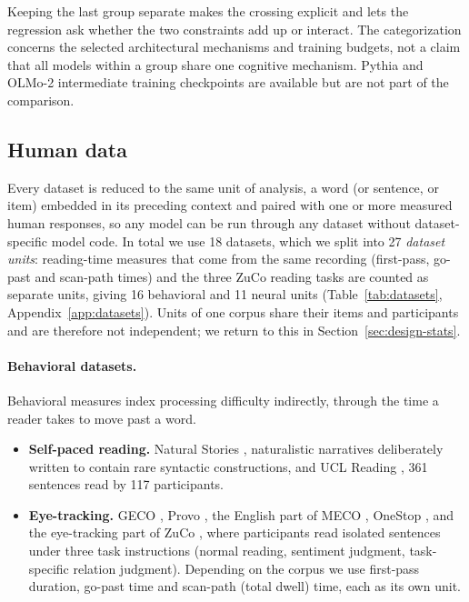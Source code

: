 Keeping the last group separate makes the crossing explicit and lets the regression ask whether the two constraints add up or interact. The categorization concerns the selected architectural mechanisms and training budgets, not a claim that all models within a group share one cognitive mechanism. Pythia and OLMo-2 intermediate training checkpoints are available but are not part of the comparison.

\subsection{Human data}
\label{sec:design-data}

Every dataset is reduced to the same unit of analysis, a word (or sentence, or item) embedded in its preceding context and paired with one or more measured human responses, so any model can be run through any dataset without dataset-specific model code. In total we use 18 datasets, which we split into 27 \emph{dataset units}: reading-time measures that come from the same recording (first-pass, go-past and scan-path times) and the three ZuCo reading tasks are counted as separate units, giving 16 behavioral and 11 neural units (Table~\ref{tab:datasets}, Appendix~\ref{app:datasets}). Units of one corpus share their items and participants and are therefore not independent; we return to this in Section~\ref{sec:design-stats}.

\paragraph{Behavioral datasets.}
Behavioral measures index processing difficulty indirectly, through the time a reader takes to move past a word.
\begin{itemize}
    \item \textbf{Self-paced reading.} Natural Stories \citep{futrell2021natural}, naturalistic narratives deliberately written to contain rare syntactic constructions, and UCL Reading \citep{frank2013reading}, 361 sentences read by 117 participants.
    \item \textbf{Eye-tracking.} GECO \citep{cop2017geco}, Provo \citep{luke2018provo}, the English part of MECO \citep{siegelman2022meco}, OneStop \citep{berzak2025onestop}, and the eye-tracking part of ZuCo \citep{hollenstein2018zuco}, where participants read isolated sentences under three task instructions (normal reading, sentiment judgment, task-specific relation judgment). Depending on the corpus we use first-pass duration, go-past time and scan-path (total dwell) time, each as its own unit.
\end{itemize}


